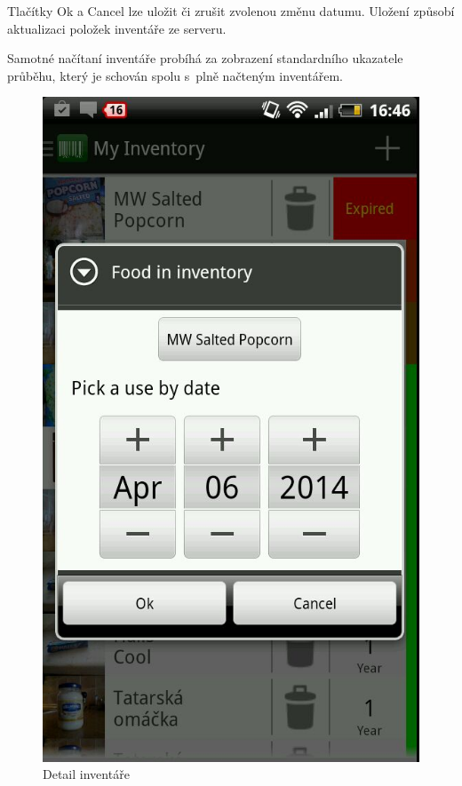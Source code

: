 \documentclass[thesis=B,czech]{FITthesis}[2013/10/20]
\begin{document}
Tlačítky Ok a Cancel lze uložit či zrušit zvolenou změnu datumu. Uložení způsobí aktualizaci položek inventáře ze serveru.

Samotné načítaní inventáře probíhá za zobrazení standardního ukazatele průběhu, který je schován spolu s~plně načteným inventářem.

\begin{figure}[H]
  \centering
  \includegraphics[scale=0.4]{screenshots/app_inventory_detail.jpg}
  \caption{Detail inventáře}
  \label{fig:AppInventoryDetail}
\end{figure}
\end{document}
